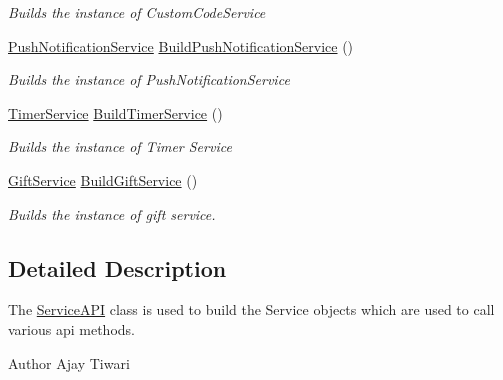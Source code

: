 \begin{DoxyCompactItemize}
\begin{DoxyCompactList}\small\item\em Builds the instance of Custom\+Code\+Service \end{DoxyCompactList}\item 
\hyperlink{classcom_1_1shephertz_1_1app42_1_1paas_1_1sdk_1_1csharp_1_1push_notification_1_1_push_notification_service}{Push\+Notification\+Service} \hyperlink{classcom_1_1shephertz_1_1app42_1_1paas_1_1sdk_1_1csharp_1_1_service_a_p_i_a503f88237eff832de46d5c1e3a1c8811}{Build\+Push\+Notification\+Service} ()
\begin{DoxyCompactList}\small\item\em Builds the instance of Push\+Notification\+Service \end{DoxyCompactList}\item 
\hyperlink{classcom_1_1shephertz_1_1app42_1_1paas_1_1sdk_1_1csharp_1_1timer_1_1_timer_service}{Timer\+Service} \hyperlink{classcom_1_1shephertz_1_1app42_1_1paas_1_1sdk_1_1csharp_1_1_service_a_p_i_a379a09729d4801e7fe5b8ddb4564816a}{Build\+Timer\+Service} ()
\begin{DoxyCompactList}\small\item\em Builds the instance of Timer Service \end{DoxyCompactList}\item 
\hyperlink{classcom_1_1shephertz_1_1app42_1_1paas_1_1sdk_1_1csharp_1_1gift_1_1_gift_service}{Gift\+Service} \hyperlink{classcom_1_1shephertz_1_1app42_1_1paas_1_1sdk_1_1csharp_1_1_service_a_p_i_af71aa7d43fdcfa52f2673e9465383361}{Build\+Gift\+Service} ()
\begin{DoxyCompactList}\small\item\em Builds the instance of gift service. \end{DoxyCompactList}\end{DoxyCompactItemize}


\subsection{Detailed Description}
The \hyperlink{classcom_1_1shephertz_1_1app42_1_1paas_1_1sdk_1_1csharp_1_1_service_a_p_i}{Service\+A\+P\+I} class is used to build the Service objects which are used to call various api methods. 

\begin{DoxyAuthor}{Author}
Ajay Tiwari 
\end{DoxyAuthor}


